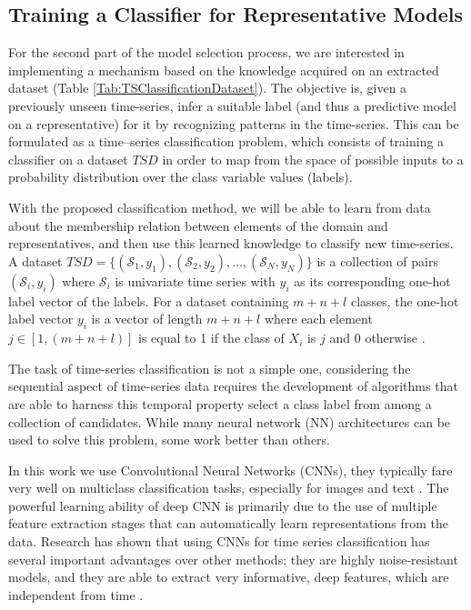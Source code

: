 \subsection{Training a Classifier for Representative Models}
\label{Sec:TrainingClassifier}
For the second part of the model selection process, we are interested in implementing a mechanism based on the knowledge acquired on an extracted dataset (Table \ref{Tab:TSClassificationDataset}). The objective is, given a previously unseen time-series, infer a suitable label (and thus a predictive model on a representative) for it by recognizing patterns in the time-series. This can be formulated as a time--series classification problem, which consists of training a classifier on a dataset $TSD$ in order to map from the space of possible inputs to a probability distribution over the class variable values (labels). 

With the proposed classification method, we will be able to learn from data about the membership relation between elements of the domain and representatives, and then use this learned knowledge to classify new time-series. A dataset $TSD=\{(\mathcal{S}_1,y_1),(\mathcal{S}_2,y_2), \ldots ,(\mathcal{S}_N,y_N)\}$ is a collection of pairs $(\mathcal{S}_i,y_i)$ where $\mathcal{S}_i$ is univariate time series with $y_i$ as its corresponding one-hot label vector of the labels. For a dataset containing $m+n+l$ classes, the one-hot label vector $y_i$ is a vector of length $m+n+l$ where each element $j \in [1,(m+n+l)]$ is equal to 1 if the class of $X_i$ is $j$ and $0$ otherwise \cite{Mitsa2010}.

The task of time-series classification is not a simple one, considering the sequential aspect of time-series data requires the development of algorithms that are able to harness this temporal property select a class label from among a collection of candidates. While many neural network (NN) architectures can be used to solve this problem, some work better than others. 

In this work we use Convolutional Neural Networks (CNNs), they typically fare very well on multiclass classification tasks, especially for images and text \cite{Fawaz2019}. The powerful learning ability of deep CNN is primarily due to the use of multiple feature extraction stages that can automatically learn representations from the data. Research has shown that using CNNs for time series classification has several important advantages over other methods; they are highly noise-resistant models, and they are able to extract very informative, deep features, which are independent from time \cite{Sainath2015}.

